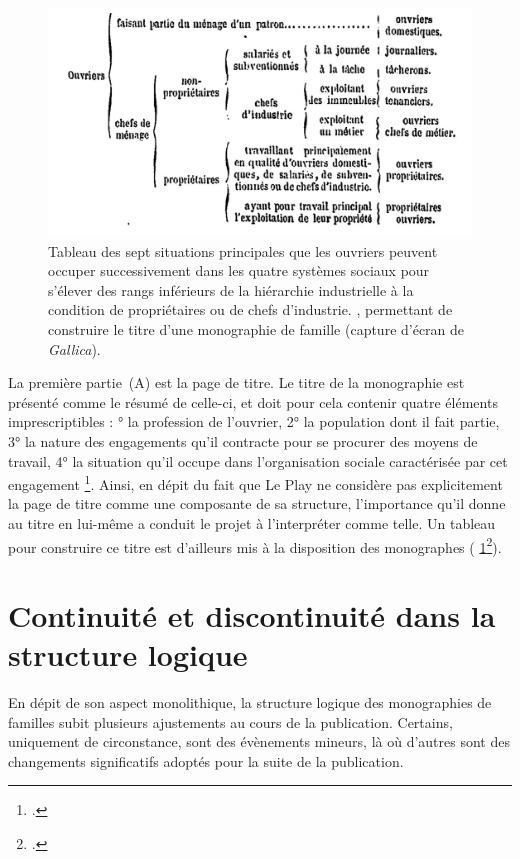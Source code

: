 \begin{figure}[ht]
    \centering
    \includegraphics{img/tabl_titres.jpg}
    \caption[Tableau des sept situations principales que les ouvriers peuvent occuper successivement]{\og Tableau des sept situations principales que les ouvriers peuvent occuper successivement dans les quatre systèmes sociaux pour s'élever des rangs inférieurs de la hiérarchie industrielle à la condition de propriétaires ou de chefs d'industrie. \fg{}, permettant de construire le titre d'une monographie de famille (capture d'écran de \textit{Gallica}).}
    \label{tabletitre}
\end{figure}

La première partie~(A) est la page de titre. Le titre de la monographie est présenté comme le \og résumé \fg{} de celle-ci, et doit pour cela contenir quatre éléments imprescriptibles : ° la profession de l'ouvrier, 2° la population dont il fait partie, 3° la nature des engagements qu'il contracte pour se procurer des moyens de travail, 4° la situation qu'il occupe dans l'organisation sociale caractérisée par cet engagement \fg{}\footcite[p. 20]{instruction62}. Ainsi, en dépit du fait que Le Play ne considère pas explicitement la page de titre comme une composante de sa structure, l'importance qu'il donne au titre en lui-même a conduit le projet \timeus{} à l'interpréter comme telle. Un tableau pour construire ce titre est d'ailleurs mis à la disposition des monographes (\fig{} \ref{tabletitre}\footcite[p. 21 .]{instruction62}).

\section[Continuité et discontinuité]{Continuité et discontinuité dans la structure logique}

En dépit de son aspect monolithique, la structure logique des monographies de familles subit plusieurs ajustements au cours de la publication. Certains, uniquement de circonstance, sont des évènements mineurs, là où d'autres sont des changements significatifs adoptés pour la suite de la publication.

